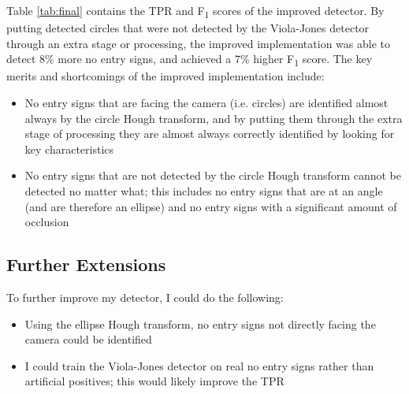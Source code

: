\documentclass[twocolumn, 10pt, a4paper]{article}
\begin{document}
Table \ref{tab:final} contains the TPR and F\textsubscript{1} scores of the improved detector.
By putting detected circles that were not detected by the Viola-Jones detector through an extra stage or processing, the improved implementation was able to detect 8\% more no entry signs, and achieved a 7\% higher F\textsubscript{1} score.
The key merits and shortcomings of the improved implementation include:
\begin{itemize}
  \item No entry signs that are facing the camera (i.e. circles) are identified almost always by the circle Hough transform, and by putting them through the extra stage of processing they are almost always correctly identified by looking for key characteristics
  \item No entry signs that are not detected by the circle Hough transform cannot be detected no matter what; this includes no entry signs that are at an angle (and are therefore an ellipse) and no entry signs with a significant amount of occlusion
\end{itemize}

\subsection{Further Extensions}

To further improve my detector, I could do the following:

\begin{itemize}
  \item Using the ellipse Hough transform, no entry signs not directly facing the camera could be identified
  \item I could train the Viola-Jones detector on real no entry signs rather than artificial positives; this would likely improve the TPR
\end{itemize}

\clearpage

\onecolumn{\printbibliography}
    
\end{document}
